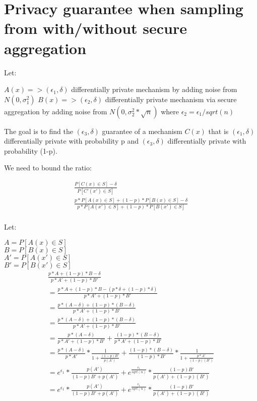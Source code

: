 \section{Privacy guarantee when sampling from with/without secure aggregation}

Let:

$A(x) => (\epsilon_{1}, \delta)$ differentially private mechanism  by adding noise from $N(0, \sigma_{1}^{2})$
$B(x) => (\epsilon_{2}, \delta)$ differentially private mechanism via secure aggregation by adding noise from $N(0, \sigma_{2}^{2}*\sqrt{n})$ where $\epsilon_{2} = \epsilon_{1}/sqrt(n)$ 

The goal is to find the $(\epsilon_{3},\delta)$ guarantee of a mechanism $C(x)$ that is $(\epsilon_{1},\delta)$ differentially private with probability p and $(\epsilon_{3},\delta)$ differentially private with probability (1-p).

We need to bound the ratio:

\begin{gather*}
\frac{P[C(x) \in S] - \delta}{P[C'(x') \in S]}\\
\frac{p*P[A(x) \in S] + (1-p)*P[B(x) \in S] - \delta}{p*P[A(x') \in S] + (1-p)*P[B(x') \in S]}\\
\end{gather*}

Let:

$A = P[A(x) \in S]$\\
$B = P[B(x) \in S]$\\
$A' = P[A(x') \in S]$\\
$B' = P[B(x') \in S]$\\

\begin{gather*}
\frac{p*A + (1-p)*B - \delta}{p*A' + (1-p)*B'}\\
=\frac{p*A + (1-p)*B - (p*\delta + (1-p)*\delta)}{p*A' + (1-p)*B'}\\
=\frac{p*(A - \delta) + (1-p)*(B - \delta)}{p*A' + (1-p)*B'}\\
=\frac{p*(A - \delta) + (1-p)*(B - \delta)}{p*A' + (1-p)*B'}\\
=\frac{p*(A - \delta)}{p*A' + (1-p)*B'} + \frac{(1-p)*(B - \delta)}{p*A' + (1-p)*B'}\\
=\frac{p*(A - \delta)}{p*A'}*\frac{1}{1+\frac{(1-p)B'}{p(A')}} + \frac{(1-p)*(B - \delta)}{(1-p)*B'}*\frac{1}{1+\frac{p*A'}{(1-p)(B')}}\\
=e^{\epsilon_{1}}*\frac{p(A')}{(1-p)B'+p(A')} + e^{\frac{\epsilon_{1}}{sqrt(n)}}*\frac{(1-p)B'}{p(A') + (1-p)(B')}\\
=e^{\epsilon_{1}}*\frac{p(A')}{(1-p)B'+p(A')} + e^{\frac{\epsilon_{1}}{sqrt(n)}}*\frac{(1-p)B'}{p(A') + (1-p)(B')}\\
\end{gather*}

